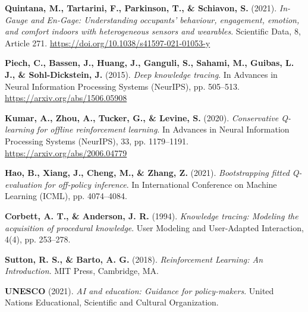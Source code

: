 \begin{enumerate}[label={[\arabic*]}]
  \item \textbf{Quintana, M., Tartarini, F., Parkinson, T., \& Schiavon, S.} (2021). \textit{In-Gauge and En-Gage: Understanding occupants' behaviour, engagement, emotion, and comfort indoors with heterogeneous sensors and wearables}. Scientific Data, 8, Article 271. \url{https://doi.org/10.1038/s41597-021-01053-y}
  \item \textbf{Piech, C., Bassen, J., Huang, J., Ganguli, S., Sahami, M., Guibas, L. J., \& Sohl-Dickstein, J.} (2015). \textit{Deep knowledge tracing}. In Advances in Neural Information Processing Systems (NeurIPS), pp. 505--513. \url{https://arxiv.org/abs/1506.05908}
  \item \textbf{Kumar, A., Zhou, A., Tucker, G., \& Levine, S.} (2020). \textit{Conservative Q-learning for offline reinforcement learning}. In Advances in Neural Information Processing Systems (NeurIPS), 33, pp. 1179--1191. \url{https://arxiv.org/abs/2006.04779}
  \item \textbf{Hao, B., Xiang, J., Cheng, M., \& Zhang, Z.} (2021). \textit{Bootstrapping fitted Q-evaluation for off-policy inference}. In International Conference on Machine Learning (ICML), pp. 4074--4084.
  \item \textbf{Corbett, A. T., \& Anderson, J. R.} (1994). \textit{Knowledge tracing: Modeling the acquisition of procedural knowledge}. User Modeling and User-Adapted Interaction, 4(4), pp. 253--278.
  \item \textbf{Sutton, R. S., \& Barto, A. G.} (2018). \textit{Reinforcement Learning: An Introduction}. MIT Press, Cambridge, MA.
  \item \textbf{UNESCO} (2021). \textit{AI and education: Guidance for policy-makers}. United Nations Educational, Scientific and Cultural Organization.
\end{enumerate}
